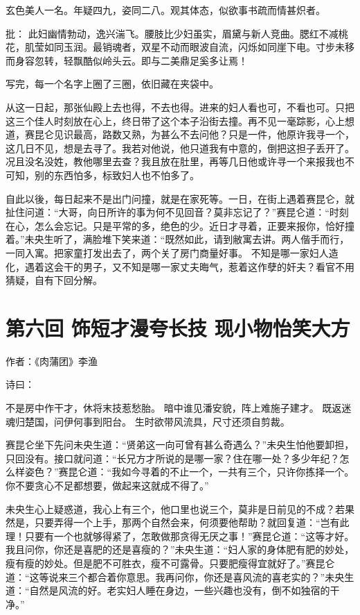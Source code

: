 \documentclass[a4paper,12pt,UTF8,twoside]{ctexbook}
\begin{document}
玄色美人一名。年疑四九，姿同二八。观其体态，似欲事书疏而情甚炽者。

批： 此妇幽情勃动，逸兴湍飞。腰肢比少妇虽实，眉黛与新人竞曲。腮红不减桃花，肌莹如同玉润。最销魂者，双星不动而眼波自流，闪烁如同崖下电。寸步未移而身容忽转，轻飘酷似岭头云。即与二美鼎足奚多让焉！

写完，每一个名字上圈了三圈，依旧藏在夹袋中。

从这一日起，那张仙殿上去也得，不去也得。进来的妇人看也可，不看也可。只把这三个佳人时刻放在心上，终日带了这个本子沿街去撞。再不见一毫踪影，心上想道，赛昆仑见识最高，路数又熟，为甚么不去问他？只是一件，他原许我寻一个，这几日不见，想是去寻了。我若对他说，他只道我有中意的，倒把这担子丢开了。况且没名没姓，教他哪里去查？我且放在肚里，再等几日他或许寻一个来报我也不可知，别的东西怕多，标致妇人也不怕多了。

自此以後，每日起来不是出门问撞，就是在家死等。一日，在街上遇着赛昆仑，就扯住问道：“大哥，向日所许的事为何不见回音？莫非忘记了？”赛昆仑道：“时刻在心，怎么会忘记。只是平常的多，绝色的少。近日才寻着，正要来报你，恰好撞着。”未央生听了，满脸堆下笑来道：“既然如此，请到敝寓去讲。两人偕手而行，一同入寓。把家童打发出去了，两个关了房门商量好事。 不知是哪一家妇人造化，遇着这会干的男子，又不知是哪一家丈夫晦气，惹着这作孽的奸夫？看官不用猜疑，自有下回分解。

\chapter{第六回 饰短才漫夸长技 现小物怡笑大方}

作者：《肉蒲团》李渔

诗曰：

不是房中作干才，休将末技惹愁胎。
暗中谁见潘安貌，阵上难施子建才。
既返迷魂归楚国，问伊何事到阳台。
生时欲带风流具，尺寸还须自剪裁。

赛昆仑坐下先问未央生道：“贤弟这一向可曾有甚么奇遇么？”未央生怕他要卸担，只回没有。接口就问道：“长兄方才所说的是哪一家？住在哪一处？多少年纪？怎么样姿色？”赛昆仑道：“我如今寻着的不止一个，一共有三个，只许你拣择一个。你不要贪心不足都想要，做起来这就成不得了。”

未央生心上疑惑道，我心上有三个，他口里也说三个，莫非是日前见的不成？若果然是，只要弄得一个上手，那两个自然会来，何须要他帮助？就回复道：“岂有此理！只要有一个也就够得紧了，怎敢做那贪得无厌之事！”赛昆仑道：“这等才好。我且问你，你还是喜肥的还是喜瘦的？”未央生道：“妇人家的身体肥有肥的妙处，瘦有瘦的妙处。但是肥不可胜衣，瘦不可露骨。只要肥瘦得宜就好了。”赛昆仑道：“这等说来三个都合着你意思。我再问你，你还是喜风流的喜老实的？”未央生道：“自然是风流的好。老实妇人睡在身边，一些兴趣也没有，倒不如独宿的干净。”
\end{document}
